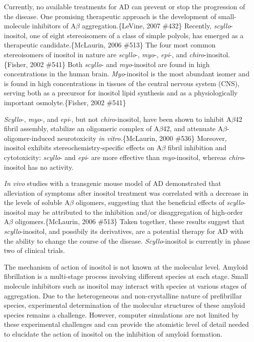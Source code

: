 Currently, no available treatments for AD can prevent or stop the progression of the disease. One promising therapeutic approach is the
development of small-molecule inhibitors of A$\beta$ aggregation.\{LeVine, 2007 \#432\} Recently, \emph{scyllo}-inositol, one of eight
stereoisomers of a class of simple polyols, has emerged as a therapeutic candidate.\{McLaurin, 2006 \#513\} The four most common stereoisomers of inositol in nature are \emph{scyllo}-, \emph{myo}-, \emph{epi}-, and \emph{chiro}-inositol.\{Fisher, 2002 \#541\} Both \emph{scyllo}- and \emph{myo}-inositol are found in high concentrations in the human brain. \emph{Myo}-inositol is the most abundant isomer and is found in high concentrations in tissues of the central nervous system (CNS), serving both as a precursor for inositol lipid synthesis and as a physiologically important osmolyte.\{Fisher, 2002 \#541\}

\emph{Scyllo}-, \emph{myo}-, and \emph{epi}-, but not \emph{chiro}-inositol, have been shown to inhibit A$\beta$42 fibril assembly, stabilize an oligomeric complex of A$\beta$42, and attenuate A$\beta$-oligomer-induced neurotoxicity \emph{in vitro.}\{McLaurin, 2000
\#536\} Moreover, inositol exhibits stereochemistry-specific effects on A$\beta$ fibril inhibition and cytotoxicity: \emph{scyllo}- and \emph{epi}- are more effective than \emph{myo}-inositol, whereas \emph{chiro}-inositol has no activity.

\emph{In vivo} studies with a transgenic mouse model of AD demonstrated that alleviation of symptoms after inositol treatment was correlated with a decrease in the levels of soluble A$\beta$ oligomers, suggesting that the beneficial effects of \emph{scyllo}-inositol may be attributed to the inhibition and/or disaggregation of high-order A$\beta$ oligomers.\{McLaurin, 2006 \#513\} Taken together, these results suggest that \emph{scyllo}-inositol, and possibily its derivatives, are a potential therapy for AD with the ability to change the course of the disease. \emph{Scyllo}-inositol is currently in phase two of clinical trials.

The mechanism of action of inositol is not known at the molecular level. Amyloid fibrillation is a multi-stage process involving different species at each stage. Small molecule inhibitors such as inositol may interact with species at various stages of aggregation. Due to the heterogeneous and non-crystalline nature of prefibrillar species, experimental determination of the molecular structures of these amyloid species remains a challenge. However, computer simulations are not limited by these experimental challenges and can provide the atomistic level of detail needed to elucidate the action of inositol on the inhibition of amyloid formation.

